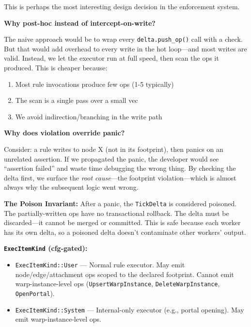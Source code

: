 \documentclass[11pt]{book}
\providecommand{\tightlist}{%
  \setlength{\itemsep}{0pt}\setlength{\parskip}{0pt}}
\newenvironment{directors}
{\begin{mdframed}[
  linecolor=blue!60,
  linewidth=2pt,
  leftline=true,
  rightline=false,
  topline=false,
  bottomline=false,
  backgroundcolor=blue!3,
  innerleftmargin=12pt,
  innerrightmargin=10pt,
  innertopmargin=8pt,
  innerbottommargin=8pt,
  skipabove=12pt,
  skipbelow=12pt
]\small\sffamily\color{blue!70!black}}
{\end{mdframed}}
\begin{document}
\begin{directors}
This is perhaps the most interesting design decision in the enforcement system.

\textbf{Why post-hoc instead of intercept-on-write?}

The naive approach would be to wrap every \texttt{delta.push\_op()} call with a check. But that would add overhead to every write in the hot loop---and most writes are valid. Instead, we let the executor run at full speed, then scan the ops it produced. This is cheaper because:

\begin{enumerate}
\item Most rule invocations produce few ops (1-5 typically)
\item The scan is a single pass over a small vec
\item We avoid indirection/branching in the write path
\end{enumerate}

\textbf{Why does violation override panic?}

Consider: a rule writes to node X (not in its footprint), then panics on an unrelated assertion. If we propagated the panic, the developer would see ``assertion failed'' and waste time debugging the wrong thing. By checking the delta first, we surface the \emph{root cause}---the footprint violation---which is almost always why the subsequent logic went wrong.

\textbf{The Poison Invariant:} After a panic, the \texttt{TickDelta} is
considered poisoned. The partially-written ops have no transactional rollback.
The delta must be discarded---it cannot be merged or committed. This is safe
because each worker has its own delta, so a poisoned delta doesn't contaminate
other workers' output.
\end{directors}

\textbf{\texttt{ExecItemKind} (cfg-gated):}

\begin{itemize}
\tightlist
\item
  \texttt{ExecItemKind::User} --- Normal rule executor. May emit
  node/edge/attachment ops scoped to the declared footprint. Cannot emit
  warp-instance-level ops (\texttt{UpsertWarpInstance},
  \texttt{DeleteWarpInstance}, \texttt{OpenPortal}).
\item
  \texttt{ExecItemKind::System} --- Internal-only executor (e.g., portal
  opening). May emit warp-instance-level ops.
\end{itemize}
\end{document}

